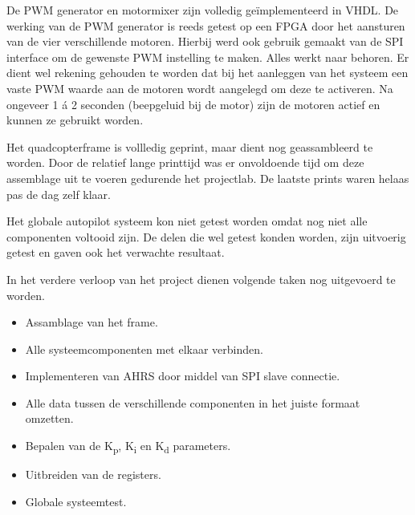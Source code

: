 	\par De PWM generator en motormixer zijn volledig ge\"implementeerd in VHDL. De werking van de PWM generator is reeds getest op een FPGA door het aansturen van de vier verschillende motoren. Hierbij werd ook gebruik gemaakt van de SPI interface om de gewenste PWM instelling te maken. Alles werkt naar behoren. Er dient wel rekening gehouden te worden dat bij het aanleggen van het systeem een vaste PWM waarde aan de motoren wordt aangelegd om deze te activeren. Na ongeveer 1 \'a 2 seconden (beepgeluid bij de motor) zijn de motoren actief en kunnen ze gebruikt worden.

	\par Het quadcopterframe is vollledig geprint, maar dient nog geassambleerd te worden. Door de relatief lange printtijd was er onvoldoende tijd om deze assemblage uit te voeren gedurende het projectlab. De laatste prints waren helaas pas de dag zelf klaar.

	\par Het globale autopilot systeem kon niet getest worden omdat nog niet alle componenten voltooid zijn. De delen die wel getest konden worden, zijn uitvoerig getest en gaven ook het verwachte resultaat.

	\par In het verdere verloop van het project dienen volgende taken nog uitgevoerd te worden.

		\begin{itemize}
			\item Assamblage van het frame.
			\item Alle systeemcomponenten met elkaar verbinden.
			\item Implementeren van AHRS door middel van SPI slave connectie.
			\item Alle data tussen de verschillende componenten in het juiste formaat omzetten.
			\item Bepalen van de K\textsubscript{p}, K\textsubscript{i} en K\textsubscript{d} parameters.
			\item Uitbreiden van de registers.
			\item Globale systeemtest.
		\end{itemize}
